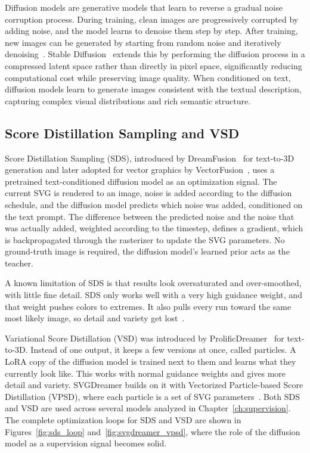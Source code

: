 Diffusion models are generative models that learn to 
reverse a gradual noise corruption process. During 
training, clean images are progressively corrupted by 
adding noise, and the model learns to denoise them step 
by step. After training, new images can be generated by 
starting from random noise and iteratively 
denoising~\cite{ho2020denoising}. Stable 
Diffusion~\cite{rombachHighResolutionImageSynthesis2021} extends this by 
performing the diffusion process in a compressed latent 
space rather than directly in pixel space, significantly 
reducing computational cost while preserving image quality. 
When conditioned on text, diffusion models learn to 
generate images consistent with the textual description, 
capturing complex visual distributions and rich semantic 
structure.

\subsection{Score Distillation Sampling and VSD}
\label{sec:sds_vsd}
Score Distillation Sampling (SDS), introduced by 
DreamFusion~\cite{pooleDreamFusionTextto3DUsing2022} for 
text-to-3D generation and later adopted for vector 
graphics by VectorFusion~\cite{jainVectorFusionTexttoSVGAbstracting2022}, 
uses a pretrained text-conditioned diffusion model as an 
optimization signal. The current SVG is rendered to an 
image, noise is added according to the diffusion schedule, 
and the diffusion model predicts which noise was added, 
conditioned on the text prompt. The difference between 
the predicted noise and the noise that was actually added, 
weighted according to the timestep, defines a 
gradient, which is backpropagated through the rasterizer 
to update the SVG parameters. No ground-truth image is 
required, the diffusion model's learned prior acts as 
the teacher.

A known limitation of SDS is that results look oversaturated 
and over-smoothed, with little fine detail. SDS only works 
well with a very high guidance weight, and that weight pushes 
colors to extremes. It also pulls every run toward the same 
most likely image, so detail and variety get 
lost~\cite{pooleDreamFusionTextto3DUsing2022, wangProlificDreamerHighFidelityDiverse2023}.

Variational Score Distillation (VSD) was introduced by 
ProlificDreamer~\cite{wangProlificDreamerHighFidelityDiverse2023} 
for text-to-3D. Instead of one output, it keeps a few versions 
at once, called particles. A LoRA copy of the diffusion model 
is trained next to them and learns what they currently look 
like. This works with normal guidance weights and gives more 
detail and variety. SVGDreamer builds on it with Vectorized 
Particle-based Score Distillation (VPSD), where each particle 
is a set of SVG parameters~\cite{xingSVGDreamerTextGuided2024}. Both SDS and VSD are used across several models analyzed 
in Chapter~\ref{ch:supervision}. The complete optimization 
loops for SDS and VSD are shown in 
Figures~\ref{fig:sds_loop} and~\ref{fig:svgdreamer_vpsd}, 
where the role of the diffusion model as a supervision 
signal becomes solid.



